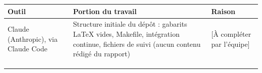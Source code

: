 {\renewcommand{\arraystretch}{1.3}
\begin{tabularx}{\linewidth}{@{}p{3.5cm}XX@{}}
\toprule
\textbf{Outil} & \textbf{Portion du travail} & \textbf{Raison} \\
\midrule
Claude (Anthropic), via Claude Code & Structure initiale du dépôt : gabarits LaTeX vides, Makefile, intégration continue, fichiers de suivi (aucun contenu rédigé du rapport) & [À compléter par l'équipe] \\ \midrule
\rule{0pt}{2em} & & \\ \midrule
\rule{0pt}{2em} & & \\ \midrule
\rule{0pt}{2em} & & \\
\bottomrule
\end{tabularx}}
